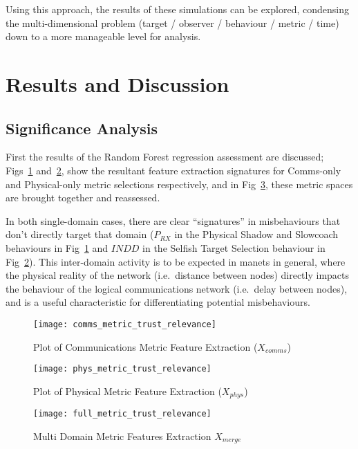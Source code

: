 Using this approach, the results of these simulations can be explored, condensing the multi-dimensional problem (target / observer / behaviour / metric / time) down to a more manageable level for analysis.

\section{Results and Discussion}

\subsection{Significance Analysis}

First the results of the Random Forest regression assessment are discussed; Figs~\ref{fig:comms_feature_extraction} and~\ref{fig:phys_feature_extraction}, show the resultant feature extraction signatures for Comms-only and Physical-only metric selections respectively, and in Fig~\ref{fig:multi_feature_extraction}, these metric spaces are brought together and reassessed.

In both single-domain cases, there are clear ``signatures'' in misbehaviours that don't directly target that domain ($P_{RX}$ in the Physical Shadow and Slowcoach behaviours in Fig~\ref{fig:comms_feature_extraction} and $INDD$ in the Selfish Target Selection behaviour in Fig~\ref{fig:phys_feature_extraction}).
This inter-domain activity is to be expected in \glspl{manet} in general, where the physical reality of the network (i.e.\ distance between nodes) directly impacts the behaviour of the logical communications network (i.e.\ delay between nodes), and is a useful characteristic for differentiating potential misbehaviours.



\begin{figure}[h!]
	\centering
  \texttt{[image: comms\_metric\_trust\_relevance]}
	\caption{Plot of Communications Metric Feature Extraction ($X_{comms}$)}
	\label{fig:comms_feature_extraction}
\end{figure}

\begin{figure}[h!]
	\centering
  \texttt{[image: phys\_metric\_trust\_relevance]}
  \caption{Plot of Physical Metric Feature Extraction ($X_{phys}$)}
	\label{fig:phys_feature_extraction}
\end{figure}

\begin{figure}[h!]
  \centering
  \texttt{[image: full\_metric\_trust\_relevance]}
  \caption{Multi Domain  Metric Features Extraction $X_{merge}$}
  \label{fig:multi_feature_extraction}
\end{figure}

